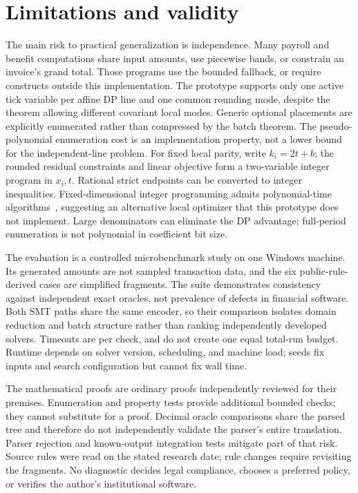 \documentclass[11pt]{article}
\begin{document}
\section{Limitations and validity}
The main risk to practical generalization is independence. Many payroll and benefit computations share input amounts, use piecewise bands, or constrain an invoice's grand total. Those programs use the bounded fallback, or require constructs outside this implementation. The prototype supports only one active tick variable per affine DP line and one common rounding mode, despite the theorem allowing different covariant local modes. Generic optional placements are explicitly enumerated rather than compressed by the batch theorem. The pseudo-polynomial enumeration cost is an implementation property, not a lower bound for the independent-line problem. For fixed local parity, write $k_i=2t+b$; the rounded residual constraints and linear objective form a two-variable integer program in $x_i,t$. Rational strict endpoints can be converted to integer inequalities. Fixed-dimensional integer programming admits polynomial-time algorithms~\citep{lenstra1983}, suggesting an alternative local optimizer that this prototype does not implement. Large denominators can eliminate the DP advantage; full-period enumeration is not polynomial in coefficient bit size.

The evaluation is a controlled microbenchmark study on one Windows machine. Its generated amounts are not sampled transaction data, and the six public-rule-derived cases are simplified fragments. The suite demonstrates consistency against independent exact oracles, not prevalence of defects in financial software. Both SMT paths share the same encoder, so their comparison isolates domain reduction and batch structure rather than ranking independently developed solvers. Timeouts are per check, and do not create one equal total-run budget. Runtime depends on solver version, scheduling, and machine load; seeds fix inputs and search configuration but cannot fix wall time.

The mathematical proofs are ordinary proofs independently reviewed for their premises. Enumeration and property tests provide additional bounded checks; they cannot substitute for a proof. Decimal oracle comparisons share the parsed tree and therefore do not independently validate the parser's entire translation. Parser rejection and known-output integration tests mitigate part of that risk. Source rules were read on the stated research date; rule changes require revisiting the fragments. No diagnostic decides legal compliance, chooses a preferred policy, or verifies the author's institutional software.
\end{document}
